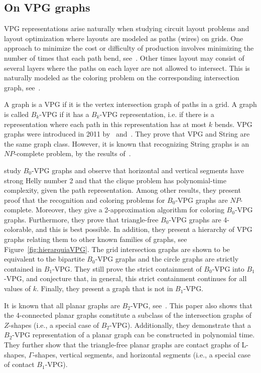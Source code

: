 \subsection{On VPG graphs}

VPG representations arise naturally when studying circuit layout problems
and layout optimization where layouts are modeled as paths (wires) on
grids. One approach to minimize the cost or difficulty of production involves minimizing the number of times that each path bend, see~\cite{bandy1990, molitor1991, sinden1966topology}.
Other times layout may consist of
several layers where the paths on each layer are not allowed to intersect. This is naturally modeled as the coloring problem on the corresponding intersection graph, see~\cite{Alcn2017VertexIG}.


A graph is a VPG if it is the vertex intersection graph of paths in a grid. A graph is called
$B_k$-VPG if it has a $B_k$-VPG representation, i.e. if there is a representation where each path in this representation has at most $k$ bends. VPG graphs were introduced in 2011 by~\citet{asinowski2011string} and~\citet{asinowski2012}. They prove that VPG and String are
the same graph class. However, it is known that  recognizing String graphs is an $NP$-complete problem, by the results of~\cite{schaefer2003recognizing, kratochvil1991string}.

\citet{asinowski2012} study $B_0$-VPG graphs and observe
that horizontal and vertical segments have strong Helly number 2 and that the clique problem has polynomial-time complexity, given the path representation. Among other results, they present proof that the recognition and coloring problems for $B_0$-VPG graphs are $NP$-complete. Moreover, they  give a 2-approximation algorithm for coloring $B_0$-VPG graphs. Furthermore, they prove that triangle-free $B_0$-VPG graphs are 4-colorable, and this is best  possible. In addition, they present a hierarchy of VPG graphs relating them to other known families of graphs, see Figure~\ref{fig:hierarquiaVPG}. The grid intersection graphs are shown to be equivalent to the bipartite $B_0$-VPG graphs and the circle graphs are strictly contained in $B_1$-VPG. They still prove the strict containment of $B_0$-VPG into $B_1$-VPG, and conjecture that, in general, this strict containment continues for all values of $k$. Finally, they present
a graph that is not in $B_1$-VPG. 




It is known that all planar graphs are $B_2$-VPG, see~\cite{chaplick2012planar}. This paper also shows that the 4-connected planar graphs constitute a subclass
of the intersection graphs of $Z$-shapes (i.e., a special case of $B_2$-VPG). Additionally, they demonstrate that a $B_2$-VPG representation of a planar
graph can be constructed in polynomial time. They further show that the triangle-free planar graphs are contact graphs of L-shapes, $\Gamma$-shapes, vertical segments, and horizontal segments (i.e., a special case of contact $B_1$-VPG). 

